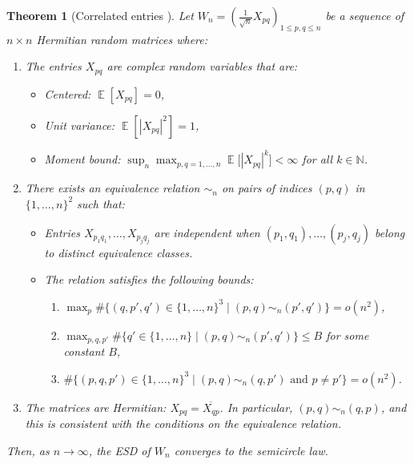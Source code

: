 \documentclass[letterpaper,11pt,oneside,reqno]{book}
\numberwithin{equation}{chapter}  %
\newtheorem{theorem}[proposition]{Theorem}
\theoremstyle{definition}
\begin{document}
\begin{theorem}[Correlated entries \cite{schenker2005semicircle}]
Let $W_n = \left(\frac{1}{\sqrt{n}} X_{pq}\right)_{1 \leq p,q \leq n}$
be a sequence of $n \times n$ Hermitian random matrices where:

\begin{enumerate}
\item The entries $X_{pq}$ are complex random variables that are:
		\begin{itemize}
		\item \textit{Centered:} $\operatorname{\mathbb{E}}[X_{pq}] = 0$,
		\item \textit{Unit variance:} $\operatorname{\mathbb{E}}[|X_{pq}|^2] = 1$,
		\item \textit{Moment bound:}
				$\displaystyle \sup_n \max_{p,q=1,\ldots,n} \operatorname{\mathbb{E}}\big[|X_{pq}|^k\big] < \infty$
				for all $k \in \mathbb{N}$.
		\end{itemize}

\item There exists an equivalence relation $\sim_n$ on pairs of indices $(p,q)$ in $\{1,\ldots,n\}^2$ such that:
		\begin{itemize}
		\item Entries $X_{p_1q_1},\ldots,X_{p_jq_j}$ are independent when
				$(p_1,q_1),\ldots,(p_j,q_j)$ belong to distinct equivalence classes.
		\item The relation satisfies the following bounds:
				\begin{enumerate}
			\item $\max_p \#\big\{(q,p',q') \in \{1,\ldots,n\}^3 \mid (p,q) \sim_n (p',q')\big\} = o(n^2)$,
				\item $\max_{p,q,p'} \#\big\{q' \in \{1,\ldots,n\} \mid (p,q) \sim_n (p',q')\big\} \leq B$ for some constant $B$,
				\item $\#\big\{(p,q,p') \in \{1,\ldots,n\}^3 \mid (p,q) \sim_n (q,p') \text{ and } p \neq p'\big\} = o(n^2)$.
				\end{enumerate}
		\end{itemize}

\item The matrices are Hermitian: $X_{pq} = \overline{X_{qp}}$.
	In particular, $(p,q)\sim_n (q,p)$, and this is consistent with the
	conditions on the equivalence relation.
\end{enumerate}

Then, as $n \to \infty$, the ESD of $W_n$ converges to the semicircle law.
\end{theorem}
\end{document}
